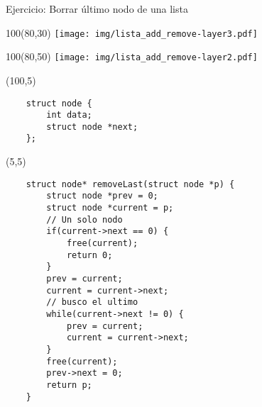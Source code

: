 \documentclass[aspectratio=169]{beamer}
\begin{document}
\begin{frame}[fragile]{Ejercicio: Borrar último nodo de una lista}
    \begin{textblock}{100}(80,30) \texttt{[image: img/lista\_add\_remove-layer3.pdf]} \end{textblock}
    \begin{textblock}{100}(80,50) \texttt{[image: img/lista\_add\_remove-layer2.pdf]} \end{textblock}
    \begin{textblock}{60}(100,5)
    \small
    \begin{verbatim}
    struct node {
        int data;
        struct node *next;
    };
    \end{verbatim}
    \end{textblock}
    \begin{textblock}{90}(5,5)
    \small
    \begin{verbatim}
    struct node* removeLast(struct node *p) {
        struct node *prev = 0;
        struct node *current = p;
        // Un solo nodo
        if(current->next == 0) {
            free(current);
            return 0;
        }
        prev = current;
        current = current->next;
        // busco el ultimo
        while(current->next != 0) {
            prev = current;
            current = current->next;
        }
        free(current);
        prev->next = 0;
        return p;
    }
    \end{verbatim}
    \end{textblock}
\end{frame}
\end{document}
